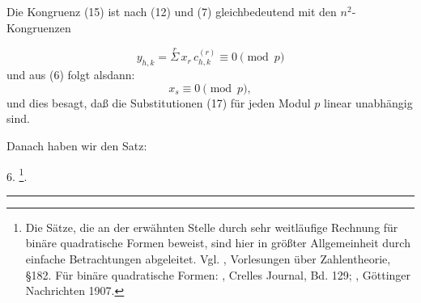 
Die Kongruenz (15) ist nach (12) und (7) gleichbedeutend
mit den $n^2$-Kongruenzen

\[
y_{h,k}=\overset{r}{\Sigma}\,x_{r}\,c_{h,k}^{(r)}\equiv 0\pmod{p} %
\]
und aus (6) folgt alsdann:
\[
x_s\equiv 0\pmod{p},
\]
und dies besagt, da\ss{} die Substitutionen (17) f\"ur jeden Modul $p$
linear unabh\"angig sind.


Danach haben wir den Satz:

6. \footnote{Die S\"atze, die  an der erw\"ahnten Stelle durch sehr weitl\"aufige
Rechnung f\"ur bin\"are quadratische Formen beweist, sind hier in gr\"o\ss ter
Allgemeinheit durch einfache Betrachtungen abgeleitet. Vgl. , Vorlesungen \"uber Zahlentheorie, \S 182. F\"ur bin\"are quadratische
Formen: , Crelles Journal, Bd. 129; , G\"ottinger Nachrichten 1907.}.

\begin{center}\rule{0.2\linewidth}{0.4pt}\end{center}
